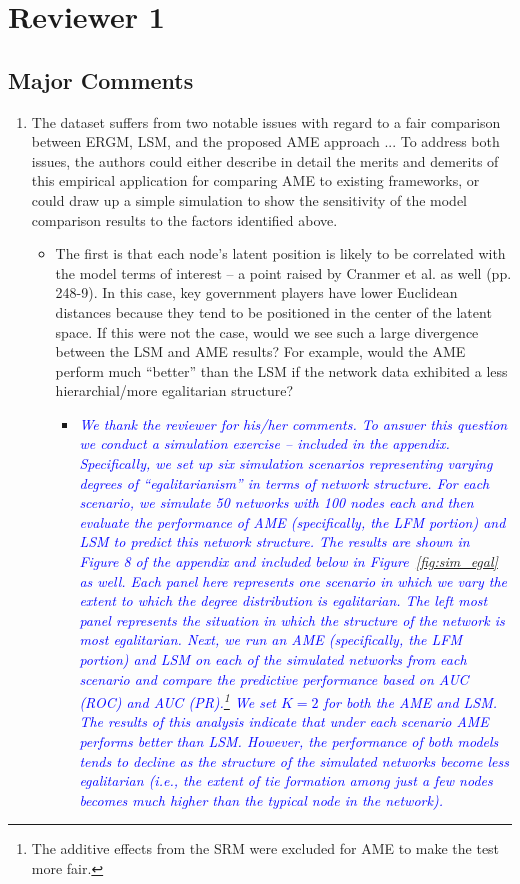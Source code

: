 \section{Reviewer 1}

\subsection{Major Comments}

\begin{enumerate}
	\item  The dataset suffers from two notable issues with regard to a fair comparison between ERGM, LSM, and the proposed AME approach ... To address both issues, the authors could either describe in detail the merits and demerits of this empirical application for comparing AME to existing frameworks, or could draw up a simple simulation to show the sensitivity of the model comparison results to the factors identified above.
	\begin{itemize}
		\item The first is that each node’s latent position is likely to be correlated with the model terms of interest – a point raised by Cranmer et al. as well (pp. 248-9). In this case, key government players have lower Euclidean distances because they tend to be positioned in the center of the latent space. If this were not the case, would we see such a large divergence between the LSM and AME results? For example, would the AME perform much ``better'' than the LSM if the network data exhibited a less hierarchial/more egalitarian structure? 
			\begin{itemize}
				\item \textcolor{blue}{ \emph{
				We thank the reviewer for his/her comments. To answer this question we conduct a simulation exercise -- included in the appendix. Specifically, we set up six simulation scenarios representing varying degrees of ``egalitarianism'' in terms of network structure. For each scenario, we simulate 50 networks with 100 nodes each and then evaluate the performance of AME (specifically, the LFM portion) and LSM to predict this network structure. The results are shown in Figure 8 of the appendix and included below in Figure~\ref{fig:sim_egal} as well. Each panel here represents one scenario in which we vary the extent to which the degree distribution is egalitarian. The left most panel represents the situation in which the structure of the network is most egalitarian. Next, we run an AME (specifically, the LFM portion) and LSM on each of the simulated networks from each scenario and compare the predictive performance based on AUC (ROC) and AUC (PR).\footnote{The additive effects from the SRM were excluded for AME to make the test more fair.} We set $K=2$ for both the AME and LSM. The results of this analysis indicate that under each scenario AME performs better than LSM. However, the performance of both models tends to decline as the structure of the simulated networks become less egalitarian (i.e., the extent of tie formation among just a few nodes becomes much higher than the typical node in the network).  
}}
\end{itemize}
\end{itemize}
\end{enumerate}
